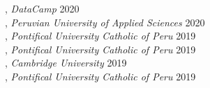 , \textit{DataCamp} \hfill 2020 \\
, \textit{Peruvian University of Applied Sciences} \hfill 2020 \\
, \textit{Pontifical University Catholic of Peru} \hfill 2019 \\
, \textit{Pontifical University Catholic of Peru} \hfill 2019 \\
, \textit{Cambridge University} \hfill 2019 \\
, \textit{Pontifical University Catholic of Peru} \hfill 2019 \\
